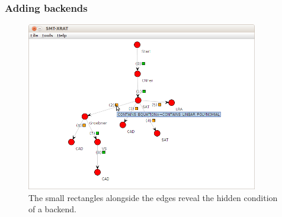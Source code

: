 \subsubsection{Adding backends}
\label{sec:adding_backends}
\begin{figure}[ht]
  \begin{center}
    \includegraphics[width=0.9\textwidth]{graphics/smt-xrat_condition_ttt.png}
  \end{center}
  \caption{The small rectangles alongside the edges reveal the hidden condition of a backend.}
  \label{fig:smt-xrat_condition_ttt}
\end{figure}

